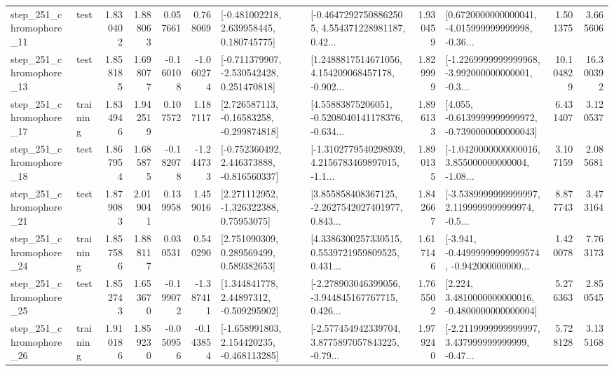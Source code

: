 \begin{tabular}{llrrrrllrlrr}
  step\_251\_chromophore\_11 &      test &      1.830402 &    1.888063 &      0.057661 &  0.768069 &    [-0.481002218, 2.639958445, 0.180745775] &  [-0.46472927508862505, 4.554371228981187, 0.42... &       1.930459 &  [0.6720000000000041, -4.015999999999998, -0.36... &            1.501375 &          3.665606 \\
  step\_251\_chromophore\_13 &      test &      1.858185 &    1.698077 &     -0.160108 & -1.060274 &   [-0.711379907, -2.530542428, 0.251470818] &  [1.2488817514671056, 4.154209068457178, -0.902... &       1.829999 &  [-1.2269999999999968, -3.992000000000001, -0.3... &           10.104829 &         16.300392 \\
  step\_251\_chromophore\_17 &  training &      1.834946 &    1.942519 &      0.107572 &  1.187117 &    [2.726587113, -0.16583258, -0.299874818] &  [4.55883875206051, -0.5208040141178376, -0.634... &       1.896133 &  [4.055, -0.6139999999999972, -0.7390000000000043] &            6.431407 &          3.120537 \\
  step\_251\_chromophore\_18 &      test &      1.867954 &    1.685875 &     -0.182078 & -1.244733 &   [-0.752360492, 2.446373888, -0.816560337] &  [-1.3102779540298939, 4.2156783469897015, -1.1... &       1.890135 &  [-1.0420000000000016, 3.855000000000004, -1.08... &            3.107159 &          2.085681 \\
  step\_251\_chromophore\_21 &      test &      1.879083 &    2.019041 &      0.139958 &  1.459016 &     [2.271112952, -1.326322388, 0.75953075] &  [3.855858408367125, -2.2627542027401977, 0.843... &       1.842667 &  [-3.5389999999999997, 2.1199999999999974, -0.5... &            8.877743 &          3.473164 \\
  step\_251\_chromophore\_24 &  training &      1.857586 &    1.888117 &      0.030531 &  0.540290 &     [2.751090309, 0.289569499, 0.589382653] &  [4.3386300257330515, 0.5539721959809525, 0.431... &       1.617146 &  [-3.941, -0.44999999999999574, -0.942000000000... &            1.420078 &          7.763173 \\
  step\_251\_chromophore\_25 &      test &      1.852743 &    1.653670 &     -0.199072 & -1.387411 &     [1.344841778, 2.44897312, -0.509295902] &  [-2.278903046399056, -3.944845167767715, 0.426... &       1.765502 &   [2.224, 3.4810000000000016, -0.4800000000000004] &            5.276363 &          2.850545 \\
  step\_251\_chromophore\_26 &  training &      1.910186 &    1.859230 &     -0.050956 & -0.143854 &   [-1.658991803, 2.154420235, -0.468113285] &  [-2.577454942339704, 3.8775897057843225, -0.79... &       1.979240 &  [-2.2119999999999997, 3.437999999999999, -0.47... &            5.728128 &          3.135168 \\

\end{tabular}
